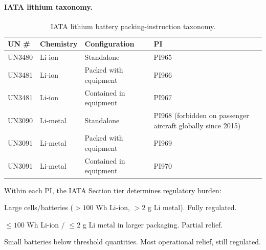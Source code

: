 \documentclass[11pt,a4paper]{article}
\theoremstyle{definition}
\begin{document}
\paragraph{IATA lithium taxonomy.}
\begin{table}[H]
\centering
\caption{IATA lithium battery packing-instruction taxonomy.}
\label{tab:lithium-taxonomy}
\begin{tabular}{p{2cm}p{3.5cm}p{4.2cm}p{1.5cm}}
\toprule
UN \# & Chemistry & Configuration & PI \\
\midrule
UN3480 & Li-ion    & Standalone & PI965 \\
UN3481 & Li-ion    & Packed with equipment & PI966 \\
UN3481 & Li-ion    & Contained in equipment & PI967 \\
UN3090 & Li-metal  & Standalone & PI968 \quad (forbidden on passenger aircraft globally since 2015) \\
UN3091 & Li-metal  & Packed with equipment & PI969 \\
UN3091 & Li-metal  & Contained in equipment & PI970 \\
\bottomrule
\end{tabular}
\end{table}

Within each PI, the IATA Section tier determines regulatory burden:
\begin{description}[leftmargin=2cm, labelwidth=1.8cm, style=nextline]
  \item[Section IA] Large cells/batteries ($>100$ Wh Li-ion, $>2$ g Li metal).
                    Fully regulated.
  \item[Section IB] $\leq 100$ Wh Li-ion / $\leq 2$ g Li metal in larger
                    packaging. Partial relief.
  \item[Section II] Small batteries below threshold quantities. Most
                    operational relief, still regulated.
\end{description}
\end{document}
